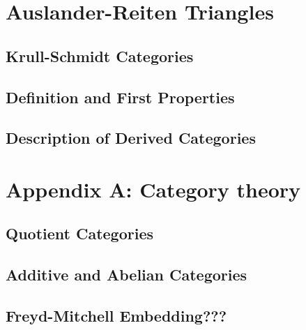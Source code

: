 \documentclass[12pt]{article}
\theoremstyle{definition}
\theoremstyle{remark}
\begin{document}
    \clearpage
    
    \section{Auslander-Reiten Triangles}

            \subsection{Krull-Schmidt Categories}

            \subsection{Definition and First Properties}

            \subsection{Description of Derived Categories}

    \clearpage

    \section*{Appendix A: Category theory}
            \subsection{Quotient Categories}
            \subsection{Additive and Abelian Categories}
            \subsection{Freyd-Mitchell Embedding???}
    
    \clearpage
\end{document}
